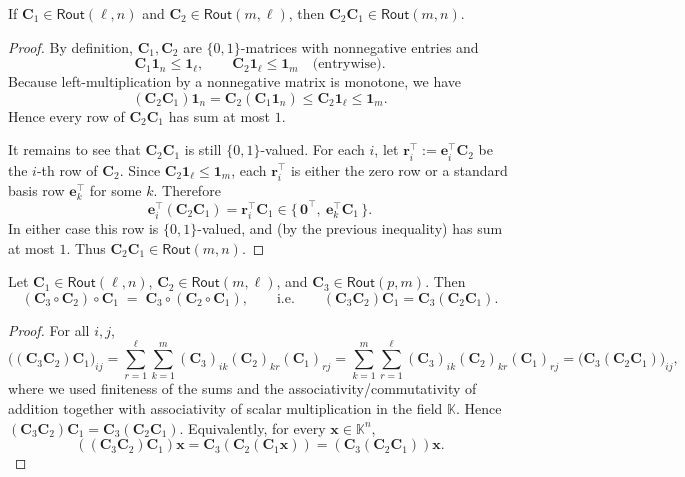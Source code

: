 \documentclass{article}
\newcommand{\K}{\mathbb{K}}                  %
\newcommand{\vect}[1]{\mathbf{#1}}           %
\newcommand{\mat}[1]{\mathbf{#1}}            %
\newcommand{\Rout}[2]{\mathsf{Rout}(#1,#2)}
\begin{document}
\begin{proposition}
If $\mat{C}_1\in\Rout{\ell}{n}$ and $\mat{C}_2\in\Rout{m}{\ell}$, then
$\mat{C}_2\mat{C}_1\in\Rout{m}{n}$.
\end{proposition}

\begin{proof}
By definition, $\mat{C}_1,\mat{C}_2$ are $\{0,1\}$-matrices with nonnegative entries and
\[
\mat{C}_1\mathbf{1}_n \le \mathbf{1}_\ell,
\qquad
\mat{C}_2\mathbf{1}_\ell \le \mathbf{1}_m
\quad\text{(entrywise).}
\]
Because left-multiplication by a nonnegative matrix is monotone, we have
\[
(\mat{C}_2\mat{C}_1)\mathbf{1}_n
=\mat{C}_2(\mat{C}_1\mathbf{1}_n)
\le \mat{C}_2\mathbf{1}_\ell
\le \mathbf{1}_m.
\]
Hence every row of $\mat{C}_2\mat{C}_1$ has sum at most $1$.

It remains to see that $\mat{C}_2\mat{C}_1$ is still $\{0,1\}$-valued.  
For each $i$, let $\vect{r}_i^\top:=\vect{e}_i^\top\mat{C}_2$ be the $i$-th row of $\mat{C}_2$.
Since $\mat{C}_2\mathbf{1}_\ell\le \mathbf{1}_m$, each $\vect{r}_i^\top$ is either the zero row or a standard basis row $\vect{e}_k^\top$ for some $k$.
Therefore
\[
\vect{e}_i^\top(\mat{C}_2\mat{C}_1)=\vect{r}_i^\top\mat{C}_1
\in \{\,\mathbf{0}^\top,\ \vect{e}_k^\top\mat{C}_1\,\}.
\]
In either case this row is $\{0,1\}$-valued, and (by the previous inequality) has sum at most $1$.
Thus $\mat{C}_2\mat{C}_1\in\Rout{m}{n}$.
\end{proof}


\begin{proposition}
Let $\mat{C}_1\in\Rout{\ell}{n}$, $\mat{C}_2\in\Rout{m}{\ell}$, and $\mat{C}_3\in\Rout{p}{m}$.
Then
\[
(\mat{C}_3\circ \mat{C}_2)\circ \mat{C}_1
\;=\;
\mat{C}_3\circ (\mat{C}_2\circ \mat{C}_1),
\qquad\text{i.e.}\qquad
(\mat{C}_3\mat{C}_2)\mat{C}_1=\mat{C}_3(\mat{C}_2\mat{C}_1).
\]
\end{proposition}

\begin{proof}
For all $i,j$,
\[
\bigl((\mat{C}_3\mat{C}_2)\mat{C}_1\bigr)_{ij}
=\sum_{r=1}^{\ell}\sum_{k=1}^{m} (\mat{C}_3)_{ik}(\mat{C}_2)_{kr}(\mat{C}_1)_{rj}
=\sum_{k=1}^{m}\sum_{r=1}^{\ell} (\mat{C}_3)_{ik}(\mat{C}_2)_{kr}(\mat{C}_1)_{rj}
=\bigl(\mat{C}_3(\mat{C}_2\mat{C}_1)\bigr)_{ij},
\]
where we used finiteness of the sums and the associativity/commutativity of addition together with associativity of scalar multiplication in the field $\K$.
Hence $(\mat{C}_3\mat{C}_2)\mat{C}_1=\mat{C}_3(\mat{C}_2\mat{C}_1)$.
Equivalently, for every $\vect{x}\in\K^{n}$,
\[
((\mat{C}_3\mat{C}_2)\mat{C}_1)\vect{x}
=\mat{C}_3(\mat{C}_2(\mat{C}_1\vect{x}))
=(\mat{C}_3(\mat{C}_2\mat{C}_1))\vect{x}.
\]
\end{proof}
\end{document}
